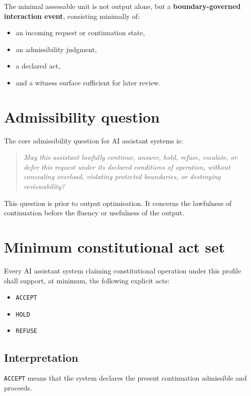 \documentclass[11pt]{article}
\begin{document}
The minimal assessable unit is not output alone, but a \textbf{boundary-governed interaction event}, consisting minimally of:
\begin{itemize}[leftmargin=2em]
    \item an incoming request or continuation state,
    \item an admissibility judgment,
    \item a declared act,
    \item and a witness surface sufficient for later review.
\end{itemize}

\section{Admissibility question}

The core admissibility question for AI assistant systems is:

\begin{quote}
\emph{May this assistant lawfully continue, answer, hold, refuse, escalate, or defer this request under its declared conditions of operation, without concealing overload, violating protected boundaries, or destroying reviewability?}
\end{quote}

This question is prior to output optimisation. It concerns the lawfulness of continuation before the fluency or usefulness of the output.

\section{Minimum constitutional act set}

Every AI assistant system claiming constitutional operation under this profile shall support, at minimum, the following explicit acts:
\begin{itemize}[leftmargin=2em]
    \item \texttt{ACCEPT}
    \item \texttt{HOLD}
    \item \texttt{REFUSE}
\end{itemize}

\subsection*{Interpretation}

\texttt{ACCEPT} means that the system declares the present continuation admissible and proceeds.
\end{document}
